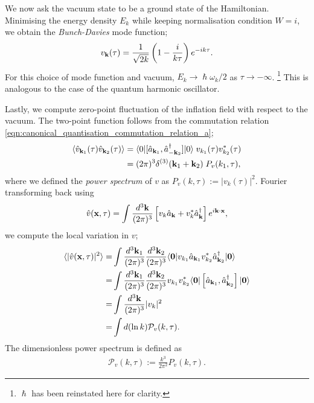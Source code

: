 We now ask the vacuum state to be a ground state of the Hamiltonian. Minimising the energy density $E_k$ while keeping normalisation condition $W=i$, we obtain the \textit{Bunch-Davies} mode function;
\begin{align}
	v_\mathbf{k}(\tau) = \frac{1}{\sqrt{2k}} \left( 1 - \frac{i}{k\tau} \right) e^{-ik\tau}. \label{eqn:bunch_davies_mode_function}
\end{align}
For this choice of mode function and vacuum, $E_k \rightarrow \hslash\omega_k/2$ as $\tau \rightarrow -\infty$. \footnote{$\hslash$ has been reinstated here for clarity.} This is analogous to the case of the quantum harmonic oscillator.

Lastly, we compute zero-point fluctuation of the inflation field with respect to the vacuum. The two-point function follows from the commutation relation \eqref{eqn:canonical_quantisation_commutation_relation_a};
\begin{align}
	\langle \hat{v}_{\mathbf{k}_1} (\tau) \hat{v}_{\mathbf{k}_2} (\tau) \rangle &= \langle 0| [\hat{a}_{\mathbf{k}_1}, \hat{a}^\dagger_{-\mathbf{k}_2}] |0 \rangle \; v_{k_1}(\tau) v^*_{k_2}(\tau) \\
	&= (2\pi)^3 \delta^{(3)} (\mathbf{k}_1 + \mathbf{k}_2 ) \; P_{v}(k_1,\tau),   \label{eqn:single_field_inflation_power_spectrum}
\end{align}
where we defined the \textit{power spectrum} of $v$ as $P_v(k,\tau) := |v_k(\tau)|^2$. Fourier transforming back using
\begin{align}
	\hat{v}(\mathbf{x}, \tau) = \int \frac{d^3\mathbf{k}}{(2\pi)^3} \left[ v_k \hat{a}_\mathbf{k} + v^*_k \hat{a}^\dagger_\mathbf{k} \right] e^{i\mathbf{k} \cdot \mathbf{x}},
\end{align}
we compute the local variation in $v$;
\begin{align}
	\langle | \hat{v}(\mathbf{x}, \tau) |^2 \rangle =& \int \frac{d^3\mathbf{k}_1}{(2\pi)^3} \frac{d^3\mathbf{k}_2}{(2\pi)^3} \langle \mathbf{0} | v_{k_1} \hat{a}_{\mathbf{k}_1} v^*_{k_2} \hat{a}^\dagger_{\mathbf{k}_2} | \mathbf{0} \rangle 	\\
	=& \int \frac{d^3\mathbf{k}_1}{(2\pi)^3} \frac{d^3\mathbf{k}_2}{(2\pi)^3} v_{k_1} v^*_{k_2} \langle \mathbf{0} | \left[ \hat{a}_{\mathbf{k}_1}, \hat{a}^\dagger_{\mathbf{k}_2} \right] | \mathbf{0} \rangle	 \\
	=& \int \frac{d^3\mathbf{k}}{(2\pi)^3} |v_k|^2	\\
	=& \int d(\ln k) \mathcal{P}_v (k,\tau).
\end{align}
The dimensionless power spectrum is defined as
\begin{align}
	\mathcal{P}_v (k,\tau) := \frac{k^3}{2\pi^2} P_v(k,\tau).
\end{align}
